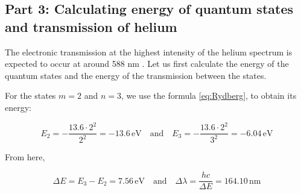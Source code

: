 \subsection{Part 3: Calculating energy of quantum states and transmission of helium}

The electronic transmission at the highest intensity of the helium spectrum is expected to occur at around 588 nm \cite{phy293_spectra_nodate}.
Let us first calculate the energy of the quantum states and the energy of the transmission between the states.

For the states $m = 2$ and $n = 3$, we use the formula \ref{eq:Rydberg}, to obtain its energy:

\begin{equation}
    E_2 = -\frac{13.6 \cdot 2^2}{2^2} = -13.6 \, \text{eV} \quad \text{and} \quad E_3 = -\frac{13.6 \cdot 2^2}{3^2} = -6.04  \, \text{eV}
\end{equation}

From here,

\begin{equation}
    \Delta E = E_3 - E_2 = 7.56 \, \text{eV} \quad \text{and} \quad \Delta \lambda = \frac{hc}{\Delta E} = 164.10 \, \text{nm}
\end{equation}

